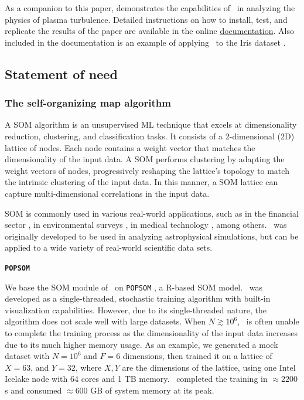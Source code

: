 As a companion to this paper, \citet{ha_machine_2025} demonstrates the capabilities of \awesom\ in analyzing the physics of plasma turbulence. Detailed instructions on how to install, test, and replicate the results of the paper are available in the online \href{https://awesom.readthedocs.io/en/latest/}{documentation}. Also included in the documentation is an example of applying \awesom\ to the Iris dataset \citep{fisher_iris_1936}.

\subsection{Statement of need}

\subsubsection{The self-organizing map algorithm}

A SOM algorithm is an unsupervised ML technique that excels at dimensionality reduction, clustering, and classification tasks.
It consists of a 2-dimensional (2D) lattice of nodes. Each node contains a weight vector that matches the dimensionality of the input data. A SOM performs clustering by adapting the weight vectors of nodes, progressively reshaping the lattice’s topology to match the intrinsic clustering of the input data.
In this manner, a SOM lattice can capture multi-dimensional correlations in the input data.

SOM is commonly used in various real-world applications, such as in the financial sector \citep[e.g.,][]{alshantti_self-organising_2021,pei_financial_2023}, in environmental surveys \citep[e.g.,][]{alvarez-guerra_assessment_2008, li_using_2020}, in medical technology \citep[e.g.,][]{hautaniemi_analysis_2003,kawaguchi_electroencephalogram-based_2024}, among others. \awesom\ was originally developed to be used in analyzing astrophysical simulations, but can be applied to a wide variety of real-world scientific data sets.

\centerline{\textbf{\texttt{POPSOM}}}

We base the SOM module of \awesom\ on \texttt{POPSOM} \citep{yuan_implementation_2018, hamel_vsom_2019}, a R-based SOM model. \popsom\ was developed as a single-threaded, stochastic training algorithm with built-in visualization capabilities. However, due to its single-threaded nature, the algorithm does not scale well with large datasets. When $N \gtrsim 10^6$, \popsom\ is often unable to complete the training process as the dimensionality of the input data increases due to its much higher memory usage. As an example, we generated a mock dataset with $N = 10^6$ and $F = 6$ dimensions, then trained it on a lattice of $X = 63$, and $Y = 32$, where $X, Y$ are the dimensions of the lattice, using one Intel Icelake node with 64 cores and 1 TB memory. \popsom\ completed the training in $\approx 2200$ s and consumed $\approx 600$ GB of system memory at its peak.

